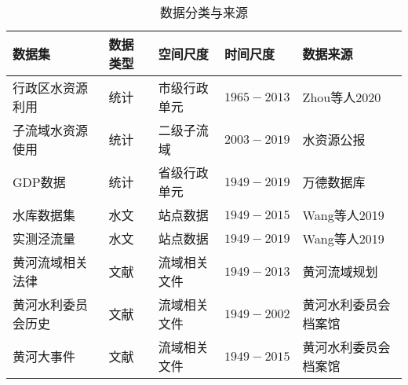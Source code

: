 \begin{table}[htbp]
    \centering
    \caption{数据分类与来源}
      \begin{tabularx}{\textwidth}{LLLLL}
      \toprule
      数据集   & 数据类型  & 空间尺度  & 时间尺度  & 数据来源 \\
      \midrule
      行政区水资源利用 & 统计    & 市级行政单元 & $1965-2013$ & Zhou等人2020 \\
      子流域水资源使用 & 统计    & 二级子流域 & $2003-2019$ & 水资源公报 \\
      GDP数据 & 统计    & 省级行政单元 & $1949-2019$ & 万德数据库 \\
      水库数据集 & 水文    & 站点数据  & $1949-2015$ & Wang等人2019 \\
      实测泾流量 & 水文    & 站点数据  & $1949-2019$ & Wang等人2019 \\
      黄河流域相关法律 & 文献    & 流域相关文件 & $1949-2013$ & 黄河流域规划 \\
      黄河水利委员会历史 & 文献    & 流域相关文件 & $1949-2002$ & 黄河水利委员会档案馆 \\
      黄河大事件 & 文献    & 流域相关文件 & $1949-2015$ & 黄河水利委员会档案馆 \\
      \bottomrule
      \end{tabularx}%
    \label{ch4:tab:data_source}%
\end{table}%
  